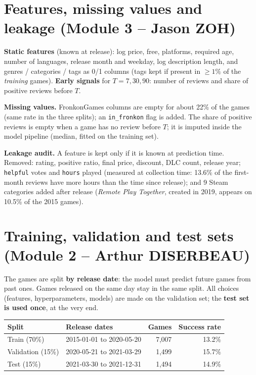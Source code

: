 \documentclass[11pt,a4paper]{article}
\newcommand{\code}[1]{\texttt{#1}}
\begin{document}
\section{Features, missing values and leakage (Module 3 -- Jason ZOH)}

\textbf{Static features} (known at release): log price, free, platforms, required age, number of
languages, release month and weekday, log description length, and genres / categories / tags as 0/1
columns (tags kept if present in $\geq 1\%$ of the \emph{training} games).
\textbf{Early signals} for $T = 7, 30, 90$: number of reviews and share of positive reviews before $T$.

\textbf{Missing values.} FronkonGames columns are empty for about 22\% of the games (same rate in the
three splits); an \code{in\_fronkon} flag is added. The share of positive reviews is empty when a game has
no review before $T$; it is imputed inside the model pipeline (median, fitted on the training set).

\textbf{Leakage audit.} A feature is kept only if it is known at prediction time. Removed: rating,
positive ratio, final price, discount, DLC count, release year; \code{helpful} votes and \code{hours}
played (measured at collection time: 13.6\% of the first-month reviews have more hours than the time since
release); and 9 Steam categories added after release (\emph{Remote Play Together}, created in 2019, appears
on 10.5\% of the 2015 games).

\section{Training, validation and test sets (Module 2 -- Arthur DISERBEAU)}

The games are split \textbf{by release date}: the model must predict future games from past ones.
Games released on the same day stay in the same split. All choices (features, hyperparameters, models)
are made on the validation set; the \textbf{test set is used once}, at the very end.

\begin{center}
\small
\begin{tabular}{l l r r}
\toprule
Split & Release dates & Games & Success rate \\
\midrule
Train (70\%) & 2015-01-01 to 2020-05-20 & 7{,}007 & 13.2\% \\
Validation (15\%) & 2020-05-21 to 2021-03-29 & 1{,}499 & 15.7\% \\
Test (15\%) & 2021-03-30 to 2021-12-31 & 1{,}494 & 14.9\% \\
\bottomrule
\end{tabular}
\end{center}
\end{document}
